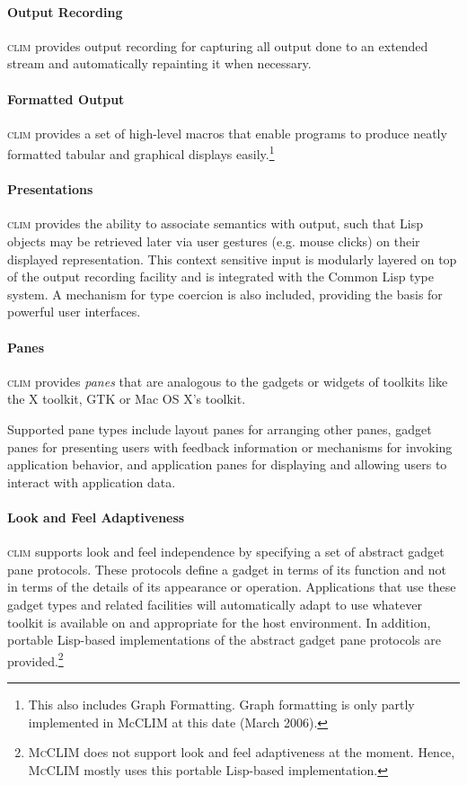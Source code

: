 \documentclass[twocolumn,a4paper]{article}
\newcommand {\concept} [1] {{\sl #1}\index{#1}}
\newcommand {\CLIM}{\textsc{clim}}
\newcommand {\mcclim}{\textsc{McCLIM}}
\begin{document}
\paragraph*{Output Recording} \CLIM{} provides output recording for
capturing all output done to an extended stream and automatically
repainting it when necessary.

\paragraph*{Formatted Output} \CLIM{} provides a set of high-level
macros that enable programs to produce neatly formatted tabular and
graphical displays easily.\footnote{This also includes Graph
  Formatting.  Graph formatting is only partly implemented in McCLIM
  at this date (March 2006).}

\paragraph*{Presentations} \CLIM{} provides the ability to associate
semantics with output, such that Lisp objects may be retrieved later
via user gestures (e.g.{} mouse clicks) on their displayed
representation. This context sensitive input is modularly layered on
top of the output recording facility and is integrated with the Common
Lisp type system. 
A mechanism for type coercion is also included,
providing the basis for powerful user interfaces.

\paragraph*{Panes} \CLIM{} provides \concept{panes} that are analogous
to the gadgets or widgets of toolkits like the X toolkit, GTK or Mac
OS X's toolkit.

Supported pane types include layout panes for arranging other panes,
gadget panes for presenting users with feedback information or
mechanisms for invoking application behavior, and application panes
for displaying and allowing users to interact with application data.

\paragraph*{Look and Feel Adaptiveness} \CLIM{} supports look and feel
independence by specifying a set of abstract gadget pane
protocols. These protocols define a gadget in terms of its function
and not in terms of the details of its appearance or
operation. Applications that use these gadget types and related
facilities will automatically adapt to use whatever toolkit is
available on and appropriate for the host environment. In addition,
portable Lisp-based implementations of the abstract gadget pane
protocols are provided.\footnote{\mcclim{} does not support look and
  feel adaptiveness at the moment. Hence, \mcclim{} mostly uses
  this portable Lisp-based implementation.}
\end{document}
